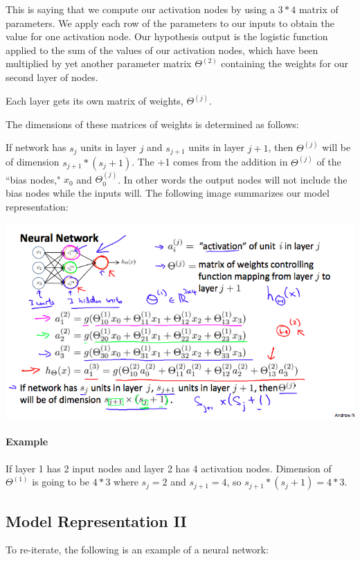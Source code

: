 \documentclass[UTF8]{article}
\begin{document}
This is saying that we compute our activation nodes by using a $3*4$ matrix of parameters. We apply each row of the parameters to our inputs to obtain the value for one activation node. Our hypothesis output is the logistic function applied to the sum of the values of our activation nodes, which have been multiplied by yet another parameter matrix $\Theta^{(2)}$ containing the weights for our second layer of nodes.

Each layer gets its own matrix of weights, $\Theta^{(j)}$.

The dimensions of these matrices of weights is determined as follows:

If network has $s_j$ units in layer $j$ and $s_{j+1}$ units in layer $j+1$, then $\Theta^{(j)}$ will be of dimension $s_{j+1}*(s_j+1)$.
The +1 comes from the addition in $\Theta^{(j)}$ of the ``bias nodes," $x_0$ and $\Theta^{(j)}_0$. In other words the output nodes will not include the bias nodes while the inputs will. The following image summarizes our model representation:

\includegraphics[width = \textwidth]{NotePics/8_1_1.png}

\paragraph{Example} If layer 1 has 2 input nodes and layer 2 has 4 activation nodes. Dimension of $\Theta^{(1)}$ is going to be $4*3$ where $s_j=2$ and $s_{j+1}=4$, so $s_{j+1}*(s_j+1)=4*3$.

\subsection{Model Representation II}

To re-iterate, the following is an example of a neural network:
\end{document}
